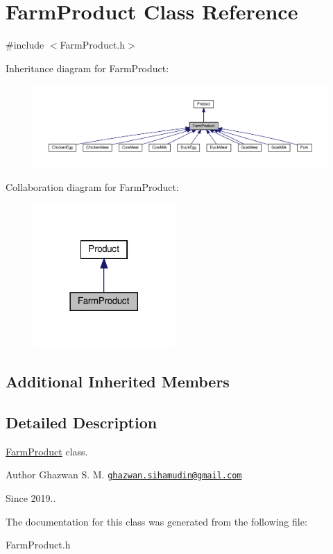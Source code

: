\hypertarget{classFarmProduct}{}\section{Farm\+Product Class Reference}
\label{classFarmProduct}


{\ttfamily \#include $<$Farm\+Product.\+h$>$}



Inheritance diagram for Farm\+Product\+:
\nopagebreak
\begin{figure}[H]
\begin{center}
\leavevmode
\includegraphics[width=350pt]{classFarmProduct__inherit__graph}
\end{center}
\end{figure}


Collaboration diagram for Farm\+Product\+:
\nopagebreak
\begin{figure}[H]
\begin{center}
\leavevmode
\includegraphics[width=153pt]{classFarmProduct__coll__graph}
\end{center}
\end{figure}
\subsection*{Additional Inherited Members}


\subsection{Detailed Description}
\hyperlink{classFarmProduct}{Farm\+Product} class.

\begin{DoxyAuthor}{Author}
Ghazwan S. M. \href{mailto:ghazwan.sihamudin@gmail.com}{\tt ghazwan.\+sihamudin@gmail.\+com} 
\end{DoxyAuthor}
\begin{DoxySince}{Since}
2019.. 
\end{DoxySince}


The documentation for this class was generated from the following file\+:\begin{DoxyCompactItemize}
\item 
Farm\+Product.\+h\end{DoxyCompactItemize}
